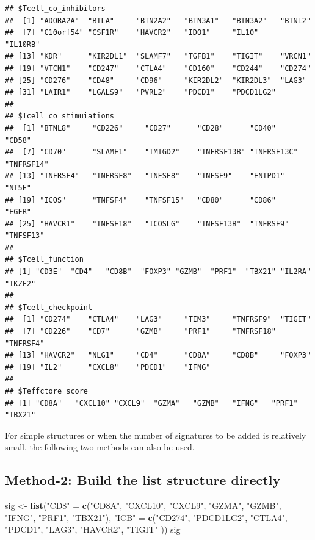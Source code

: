 \documentclass[
  12pt,
]{book}
\newenvironment{Shaded}{\begin{snugshade}}{\end{snugshade}}
\newcommand{\FunctionTok}[1]{\textcolor[rgb]{0.13,0.29,0.53}{\textbf{#1}}}
\newcommand{\NormalTok}[1]{#1}
\newcommand{\OtherTok}[1]{\textcolor[rgb]{0.56,0.35,0.01}{#1}}
\newcommand{\StringTok}[1]{\textcolor[rgb]{0.31,0.60,0.02}{#1}}
\begin{document}
\begin{verbatim}
## $Tcell_co_inhibitors
##  [1] "ADORA2A"  "BTLA"     "BTN2A2"   "BTN3A1"   "BTN3A2"   "BTNL2"   
##  [7] "C10orf54" "CSF1R"    "HAVCR2"   "IDO1"     "IL10"     "IL10RB"  
## [13] "KDR"      "KIR2DL1"  "SLAMF7"   "TGFB1"    "TIGIT"    "VRCN1"   
## [19] "VTCN1"    "CD247"    "CTLA4"    "CD160"    "CD244"    "CD274"   
## [25] "CD276"    "CD48"     "CD96"     "KIR2DL2"  "KIR2DL3"  "LAG3"    
## [31] "LAIR1"    "LGALS9"   "PVRL2"    "PDCD1"    "PDCD1LG2"
## 
## $Tcell_co_stimuiations
##  [1] "BTNL8"     "CD226"     "CD27"      "CD28"      "CD40"      "CD58"     
##  [7] "CD70"      "SLAMF1"    "TMIGD2"    "TNFRSF13B" "TNFRSF13C" "TNFRSF14" 
## [13] "TNFRSF4"   "TNFRSF8"   "TNFSF8"    "TNFSF9"    "ENTPD1"    "NT5E"     
## [19] "ICOS"      "TNFSF4"    "TNFSF15"   "CD80"      "CD86"      "EGFR"     
## [25] "HAVCR1"    "TNFSF18"   "ICOSLG"    "TNFSF13B"  "TNFRSF9"   "TNFSF13"  
## 
## $Tcell_function
## [1] "CD3E"  "CD4"   "CD8B"  "FOXP3" "GZMB"  "PRF1"  "TBX21" "IL2RA" "IKZF2"
## 
## $Tcell_checkpoint
##  [1] "CD274"    "CTLA4"    "LAG3"     "TIM3"     "TNFRSF9"  "TIGIT"   
##  [7] "CD226"    "CD7"      "GZMB"     "PRF1"     "TNFRSF18" "TNFRSF4" 
## [13] "HAVCR2"   "NLG1"     "CD4"      "CD8A"     "CD8B"     "FOXP3"   
## [19] "IL2"      "CXCL8"    "PDCD1"    "IFNG"    
## 
## $Teffctore_score
## [1] "CD8A"   "CXCL10" "CXCL9"  "GZMA"   "GZMB"   "IFNG"   "PRF1"   "TBX21"
\end{verbatim}

For simple structures or when the number of signatures to be added is relatively small, the following two methods can also be used.

\hypertarget{method-2-build-the-list-structure-directly}{%
\subsection{Method-2: Build the list structure directly}\label{method-2-build-the-list-structure-directly}}

\begin{Shaded}
\begin{Highlighting}[]
\NormalTok{sig }\OtherTok{\textless{}{-}} \FunctionTok{list}\NormalTok{(}\StringTok{"CD8"} \OtherTok{=} \FunctionTok{c}\NormalTok{(}\StringTok{"CD8A"}\NormalTok{,  }\StringTok{"CXCL10"}\NormalTok{, }\StringTok{"CXCL9"}\NormalTok{,  }\StringTok{"GZMA"}\NormalTok{,   }\StringTok{"GZMB"}\NormalTok{,   }\StringTok{"IFNG"}\NormalTok{,   }\StringTok{"PRF1"}\NormalTok{,   }\StringTok{"TBX21"}\NormalTok{),}
            \StringTok{"ICB"} \OtherTok{=} \FunctionTok{c}\NormalTok{(}\StringTok{"CD274"}\NormalTok{,   }\StringTok{"PDCD1LG2"}\NormalTok{, }\StringTok{"CTLA4"}\NormalTok{,    }\StringTok{"PDCD1"}\NormalTok{,    }\StringTok{"LAG3"}\NormalTok{,     }\StringTok{"HAVCR2"}\NormalTok{,   }\StringTok{"TIGIT"}\NormalTok{ ))}
\NormalTok{sig}
\end{Highlighting}
\end{Shaded}
\end{document}
